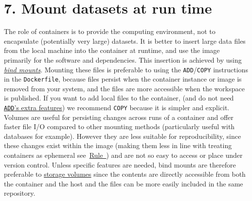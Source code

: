 \documentclass[10pt,letterpaper]{article}
\begin{document}
\hypertarget{mount-datasets-at-run-time}{%
\section*{7. Mount datasets at run
time}\label{mount-datasets-at-run-time}}

  \label{rule:mount} 

The role of containers is to provide the computing environment, not to
encapsulate (potentially very large) datasets. It is better to insert
large data files from the local machine into the container at runtime,
and use the image primarily for the software and dependencies. This
insertion is achieved by using
\href{https://docs.docker.com/storage/bind-mounts/}{\emph{bind mounts}}.
Mounting these files is preferable to using the
\texttt{ADD}/\texttt{COPY} instructions in the \texttt{Dockerfile},
because files persist when the container instance or image is removed
from your system, and the files are more accessible when the workspace
is published. If you want to add local files to the container, (and do
not need
\href{https://docs.docker.com/engine/reference/builder/\#add}{\texttt{ADD}'s
extra features}) we recommend \texttt{COPY} because it is simpler and
explicit. Volumes are useful for persisting changes across runs of a
container and offer faster file I/O compared to other mounting methods
(particularly useful with databases for example). However they are less
suitable for reproducibility, since these changes exist within the image
(making them less in line with treating containers as ephemeral
see~\hyperref[{rule:usage}]{Rule~}) and are not so
easy to access or place under version control. Unless specific features
are needed, bind mounts are therefore preferable to
\href{https://docs.docker.com/storage/volumes/}{storage volumes} since
the contents are directly accessible from both the container and the
host and the files can be more easily included in the same repository.
\end{document}
